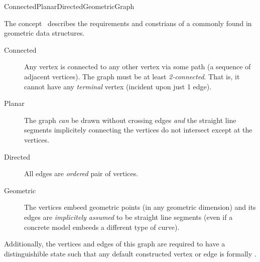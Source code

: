 
\begin{ccRefConcept}{ConnectedPlanarDirectedGeometricGraph}


\ccDefinition

The concept \ccRefName\ describes the requirements and constrians of a  commonly found in geometric data structures.


\begin{description}
\item[Connected] 
Any vertex is connected to any other vertex via some path (a sequence of adjacent vertices).
The graph must be at least {\em 2-connected}. That is, it cannot have any {\em terminal} vertex (incident upon just 1 edge).

\item[Planar]
The graph \textit{can} be drawn without crossing edges \textit{and} the straight line segments implicitely connecting the vertices do not intersect except at the vertices.

\item[Directed]
All edges are {\em ordered} pair of vertices.

\item[Geometric]
The vertices embeed geometric points (in any geometric dimension) and its edges are {\em implicitely assumed} to be straight line segments (even if a concrete model embeeds a different type of curve).

\end{description}

Additionally, the vertices and edges of this graph are required to have a distinguishible  state such that any default constructed vertex or edge is formally .
  

\end{ccRefConcept}
